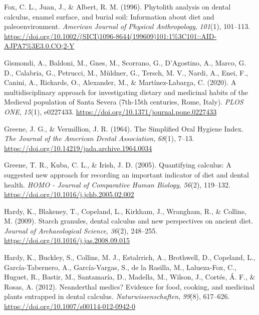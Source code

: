 \documentclass[
  letterpaper,
]{book}
\newlength{\cslhangindent}
\newlength{\cslentryspacingunit} %
\newenvironment{CSLReferences}[2] %
 {%
  \setlength{\parindent}{0pt}
  \ifodd #1
  \let\oldpar\par
  \def\par{\hangindent=\cslhangindent\oldpar}
  \fi
  \setlength{\parskip}{#2\cslentryspacingunit}
 }%
 {}
\begin{document}
\begin{CSLReferences}{1}{0}
\leavevmode{}%
Fox, C. L., Juan, J., \& Albert, R. M. (1996). Phytolith analysis on
dental calculus, enamel surface, and burial soil: {Information} about
diet and paleoenvironment. \emph{American Journal of Physical
Anthropology}, \emph{101}(1), 101--113.
\url{https://doi.org/10.1002/(SICI)1096-8644(199609)101:1\%3C101::AID-AJPA7\%3E3.0.CO;2-Y}

\leavevmode{}%
Gismondi, A., Baldoni, M., Gnes, M., Scorrano, G., D'Agostino, A.,
Marco, G. D., Calabria, G., Petrucci, M., Müldner, G., Tersch, M. V.,
Nardi, A., Enei, F., Canini, A., Rickards, O., Alexander, M., \&
Martínez-Labarga, C. (2020). A multidisciplinary approach for
investigating dietary and medicinal habits of the {Medieval} population
of {Santa Severa} (7th-15th centuries, {Rome}, {Italy}). \emph{PLOS
ONE}, \emph{15}(1), e0227433.
\url{https://doi.org/10.1371/journal.pone.0227433}

\leavevmode{}%
Greene, J. G., \& Vermillion, J. R. (1964). The {Simplified Oral Hygiene
Index}. \emph{The Journal of the American Dental Association},
\emph{68}(1), 7--13.
\url{https://doi.org/10.14219/jada.archive.1964.0034}

\leavevmode{}%
Greene, T. R., Kuba, C. L., \& Irish, J. D. (2005). Quantifying
calculus: {A} suggested new approach for recording an important
indicator of diet and dental health. \emph{HOMO - Journal of Comparative
Human Biology}, \emph{56}(2), 119--132.
\url{https://doi.org/10.1016/j.jchb.2005.02.002}

\leavevmode{}%
Hardy, K., Blakeney, T., Copeland, L., Kirkham, J., Wrangham, R., \&
Collins, M. (2009). Starch granules, dental calculus and new
perspectives on ancient diet. \emph{Journal of Archaeological Science},
\emph{36}(2), 248--255. \url{https://doi.org/10.1016/j.jas.2008.09.015}

\leavevmode{}%
Hardy, K., Buckley, S., Collins, M. J., Estalrrich, A., Brothwell, D.,
Copeland, L., García-Tabernero, A., García-Vargas, S., de la Rasilla,
M., Lalueza-Fox, C., Huguet, R., Bastir, M., Santamaría, D., Madella,
M., Wilson, J., Cortés, Á. F., \& Rosas, A. (2012). Neanderthal medics?
{Evidence} for food, cooking, and medicinal plants entrapped in dental
calculus. \emph{Naturwissenschaften}, \emph{99}(8), 617--626.
\url{https://doi.org/10.1007/s00114-012-0942-0}


\end{CSLReferences}
\end{document}
